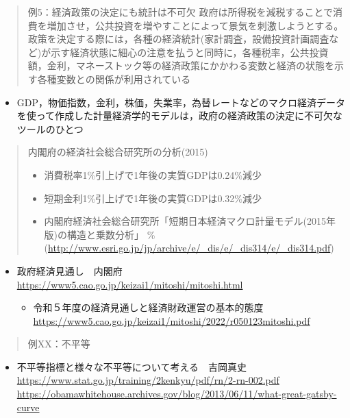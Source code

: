 \documentclass[
]{book}
\providecommand{\tightlist}{%
  \setlength{\itemsep}{0pt}\setlength{\parskip}{0pt}}
\theoremstyle{definition}
\theoremstyle{definition}
\theoremstyle{definition}
\theoremstyle{definition}
\theoremstyle{remark}
\begin{document}
\begin{quote}
例5：経済政策の決定にも統計は不可欠
政府は所得税を減税することで消費を増加させ，公共投資を増やすことによって景気を刺激しようとする。政策を決定する際には，各種の経済統計(家計調査，設備投資計画調査など)が示す経済状態に細心の注意を払うと同時に，各種税率，公共投資額，金利，マネーストック等の経済政策にかかわる変数と経済の状態を示す各種変数との関係が利用されている
\end{quote}

\begin{itemize}
\tightlist
\item
  GDP，物価指数，金利，株価，失業率，為替レートなどのマクロ経済データを使って作成した計量経済学的モデルは，政府の経済政策の決定に不可欠なツールのひとつ
\end{itemize}

\begin{quote}
内閣府の経済社会総合研究所の分析(2015)

\begin{itemize}
\tightlist
\item
  消費税率1\%引上げで1年後の実質GDPは0.24\%減少
\item
  短期金利1\%引上げで1年後の実質GDPは0.32\%減少
\item
  内閣府経済社会総合研究所「短期日本経済マクロ計量モデル(2015年版)の構造と乗数分析」
  \%(\url{http://www.esri.go.jp/jp/archive/e/_dis/e/_dis314/e/_dis314.pdf})
\end{itemize}
\end{quote}

\begin{itemize}
\tightlist
\item
  政府経済見通し　内閣府　\url{https://www5.cao.go.jp/keizai1/mitoshi/mitoshi.html}

  \begin{itemize}
  \tightlist
  \item
    令和５年度の経済見通しと経済財政運営の基本的態度 \url{https://www5.cao.go.jp/keizai1/mitoshi/2022/r050123mitoshi.pdf}
  \end{itemize}
\end{itemize}

\begin{quote}
例XX：不平等
\end{quote}

\begin{itemize}
\tightlist
\item
  不平等指標と様々な不平等について考える　吉岡真史　\url{https://www.stat.go.jp/training/2kenkyu/pdf/rn/2-rn-002.pdf}
  \url{https://obamawhitehouse.archives.gov/blog/2013/06/11/what-great-gatsby-curve}
\end{itemize}
\end{document}
